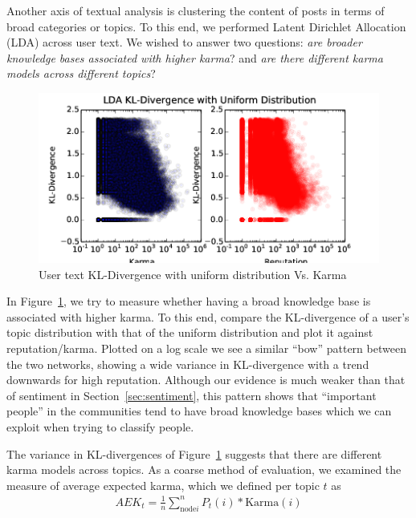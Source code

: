\documentclass[11pt]{article}
\begin{document}
Another axis of textual analysis is clustering the content of posts in terms of
broad categories or topics. To this end, we performed Latent Dirichlet
Allocation (LDA) \cite{blei2003latent} across user text. We wished to answer two
questions: \textit{are broader knowledge bases associated with higher karma}?
and \textit{are there different karma models across different topics}?

\begin{figure}[h]
\centering
\includegraphics[width=\linewidth]{lda_kl-png}
\caption{User text KL-Divergence with uniform distribution Vs. Karma}
\label{fig:lda_kl}
\end{figure}

In Figure~\ref{fig:lda_kl}, we try to measure whether having a broad knowledge
base is associated with higher karma. To this end, compare the KL-divergence of
a user's topic distribution with that of the uniform distribution and plot it
against reputation/karma. Plotted on a log scale we see a similar ``bow''
pattern between the two networks, showing a wide variance in KL-divergence with
a trend downwards for high reputation. Although our evidence is much weaker than
that of sentiment in Section~\ref{sec:sentiment}, this pattern shows that
``important people'' in the communities tend to have broad knowledge bases which
we can exploit when trying to classify people.

The variance in KL-divergences of Figure~\ref{fig:lda_kl} suggests that there
are different karma models across topics. As a coarse method of evaluation, we
examined the measure of average expected karma, which we defined per topic $t$
as
\begin{align*}
AEK_t = \frac{1}{n} \sum_{\text{node} i}^n P_t(i) * \text{Karma}(i)
\end{align*}
\end{document}
